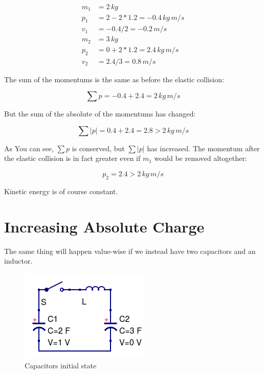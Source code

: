 \documentclass[]{elementary-physics}
\begin{document}
\begin{subequations}
\begin{align}
m_1 &= 2 \, kg \\
p_1 &= 2 - 2*1.2 = -0.4 \, kg \, m/s \\
v_1 &= -0.4 / 2 = -0.2 \, m/s \\
m_2 &= 3 \, kg \\
p_2 &= 0 + 2*1.2 = 2.4 \, kg \, m/s \\
v_2 &= 2.4 / 3 = 0.8 \, m/s
\end{align}
\end{subequations}

The sum of the momentums is the same as before the elastic collision:

\begin{equation}
\sum p = -0.4 + 2.4 = 2 \, kg \, m/s
\end{equation}

But the sum of the absolute of the momentums has changed:

\begin{equation}
\sum | p | = 0.4 + 2.4 = 2.8 > 2 \, kg \, m/s
\end{equation}

As You can see, $\sum p$ is conserved, but $\sum | p |$ has increased.
The momentum after the elastic collision is in fact greater even if $m_1$ would be removed altogether:

\begin{equation}
p_2 = 2.4 > 2 \, kg \, m/s
\end{equation}

Kinetic energy is of course constant.
 
\section{Increasing Absolute Charge}

The same thing will happen value-wise if we instead have two capacitors and an inductor.

\begin{figure}[ht] \centering
	\includegraphics[scale=.5]{ccl7} \caption{Capacitors initial state}
\end{figure}
\end{document}
